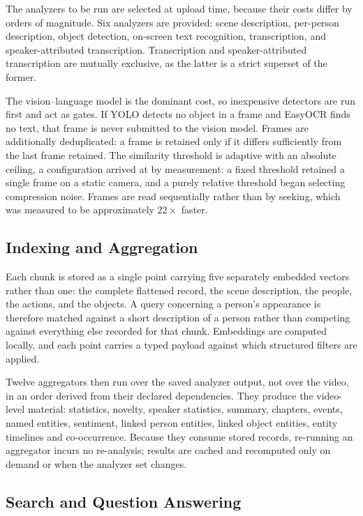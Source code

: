 The analyzers to be run are selected at upload time, because their costs differ by
orders of magnitude. Six analyzers are provided: scene description, per-person
description, object detection, on-screen text recognition, transcription, and
speaker-attributed transcription. Transcription and speaker-attributed transcription
are mutually exclusive, as the latter is a strict superset of the former.

The vision--language model is the dominant cost, so inexpensive detectors are run first
and act as gates. If YOLO detects no object in a frame and EasyOCR finds no text, that
frame is never submitted to the vision model. Frames are additionally deduplicated: a
frame is retained only if it differs sufficiently from the last frame retained. The
similarity threshold is adaptive with an absolute ceiling, a configuration arrived at
by measurement: a fixed threshold retained a single frame on a static camera, and a
purely relative threshold began selecting compression noise. Frames are read
sequentially rather than by seeking, which was measured to be approximately
$22\times$ faster.

\subsection{Indexing and Aggregation}

Each chunk is stored as a single point carrying five separately embedded vectors rather
than one: the complete flattened record, the scene description, the people, the
actions, and the objects. A query concerning a person's appearance is therefore matched
against a short description of a person rather than competing against everything else
recorded for that chunk. Embeddings are computed locally, and each point carries a
typed payload against which structured filters are applied.

Twelve aggregators then run over the saved analyzer output, not over the video,
in an order derived from their declared dependencies. They produce the video-level
material: statistics, novelty, speaker statistics, summary, chapters, events, named
entities, sentiment, linked person entities, linked object entities, entity timelines
and co-occurrence. Because they consume stored records, re-running an aggregator incurs
no re-analysis; results are cached and recomputed only on demand or when the analyzer
set changes.

\subsection{Search and Question Answering}

